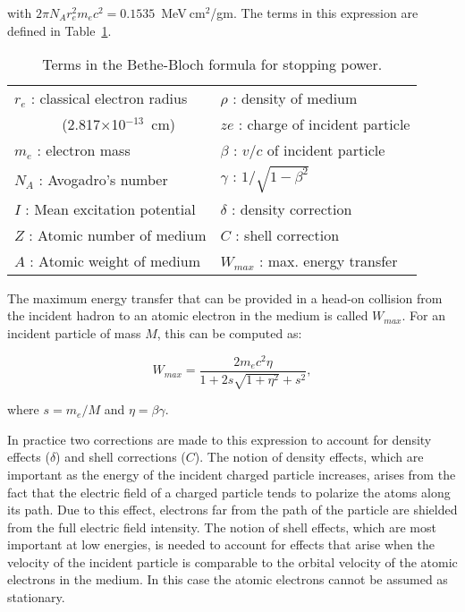 \documentclass[12pt]{article}
\begin{document}
\noindent
with $2 \pi N_A r_e^2 m_e c^2 = 0.1535$~MeV$~\!$cm$^2$/gm.  The terms in this expression are defined in Table~\ref{explan}.

\begin{table}[htbp]
\begin{center}
\begin{tabular} {||l||l||} \hline \hline
$r_e$ : classical electron radius   & $\rho$ : density of medium \\
~~~~~~ (2.817$\times$10$^{-13}$~cm) & $ze$ : charge of incident particle \\
$m_e$ : electron mass               & $\beta$ : $v/c$ of incident particle \\
$N_A$ : Avogadro's number           & $\gamma$ : $1/\sqrt{1 - \beta^2}$ \\
$I$  : Mean excitation potential    & $\delta$ : density correction \\
$Z$ : Atomic number of medium       & $C$ : shell correction \\
$A$ : Atomic weight of medium       & $W_{max}$ : max. energy transfer \\ \hline
\end{tabular}
\end{center}
\caption{\small{Terms in the Bethe-Bloch formula for stopping power.}}
\label{explan}
\end{table}

The maximum energy transfer that can be provided in a head-on collision from the incident hadron to an atomic electron in the medium is called $W_{max}$.  For an incident particle
of mass $M$, this can be computed as:

\begin{equation}
W_{max} = \frac{2 m_e c^2 \eta}{1 + 2 s \sqrt{1 + \eta^2} + s^2},
\end{equation}

\noindent
where $s = m_e/M$ and $\eta = \beta \gamma$.

In practice two corrections are made to this expression to account for density effects ($\delta$) and shell corrections ($C$).  The notion of density effects, which are important
as the energy of the incident charged particle increases, arises from the fact that the electric field of a charged particle tends to polarize the atoms along its path.  Due to this
effect, electrons far from the path of the particle are shielded from the full electric field intensity.  The notion of shell effects, which are most important at low energies, 
is needed to account for effects that arise when the velocity of the incident particle is comparable to the orbital velocity of the atomic electrons in the medium.  In this case the 
atomic electrons cannot be assumed as stationary.
\end{document}
